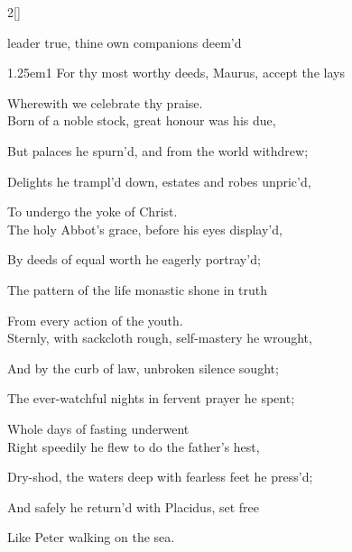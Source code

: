 \begin{paracol}{2}[]
\sloppy

\vspace{-1\baselineskip}

\firstEvensong


\firstEvensongHymn\label{MaurusEvensong}

 leader true, thine own companions deem'd


\begin{hangparas}{1.25em}{1}
For thy most worthy deeds, Maurus, accept the lays

Wherewith we celebrate thy praise.\\

Born of a noble stock, great honour was his due,

But palaces he spurn'd, and from the world withdrew;

Delights he trampl'd down, estates and robes unpric'd,

To undergo the yoke of Christ.\\

The holy Abbot's grace, before his eyes display'd,

By deeds of equal worth he eagerly portray'd;

The pattern of the life monastic shone in truth

From every action of the youth.\\

Sternly, with sackcloth rough, self-mastery he wrought,

And by the curb of law, unbroken silence sought;

The ever-watchful nights in fervent prayer he spent;

Whole days of fasting underwent\\

Right speedily he flew to do the father's hest,

Dry-shod, the waters deep with fearless feet he press'd;

And safely he return'd with Placidus, set free

Like Peter walking on the sea.\\


\end{hangparas}
\end{paracol}
